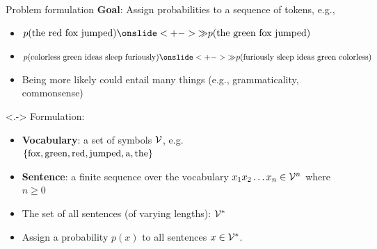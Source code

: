 \documentclass[usenames,dvipsnames,notes,11pt,aspectratio=169,hyperref={colorlinks=true, linkcolor=blue}]{beamer}
\newcommand{\pdfnote}[1]{}
\begin{document}
\begin{frame}
    {Problem formulation}
    \textbf{Goal}: Assign probabilities to a sequence of tokens, e.g., \\
    \begin{itemize}[<+->]
        \item $p(\text{the red fox jumped})
            \onslide<+->{\gg} p(\text{the green fox jumped})$
        \item $p(\text{colorless green ideas sleep furiously})
            \onslide<+->{\gg} p(\text{furiously sleep ideas green colorless})$
        \item Being more likely could entail many things (e.g., grammaticality, commonsense)
    \end{itemize}

    \onslide<.->{
        Formulation:\\}
    \begin{itemize}[<+->]
        \item \textbf{Vocabulary}: a set of symbols $\mathcal{V}$, e.g.\\
            \indent $\left\{ \text{fox}, \text{green}, \text{red}, \text{jumped}, \text{a}, \text{the} \right\}$
        \item \textbf{Sentence}: a {finite} sequence over the vocabulary $x_1 x_2 \ldots x_n \in \mathcal{V}^n$ where $n\ge 0$ %
        \item The set of all sentences (of varying lengths): $\mathcal{V}^*$ 
        \item Assign a probability $p(x)$ to all sentences $x\in\mathcal{V}^*$. 
    \end{itemize}
    \pdfnote{
        red > green: green fox is very rare.
        Grammatically correct sentences is more likely than gibberish.
    }
    \pdfnote{
        Language models tell us how likely we'll encounter a sentence in English. 
        A common misconception is that low probability under an LM means ungrammatical text. However, a sentence can be rare due to many reasons, it could contain rare words, being ungrammatical, or doesn't make any sense. Low probability doesn't necessarily mean ungrammaticality.
    }
    \pdfnote{
        Today, our task is to model this distribution and estimate its params given a corpus.
    }
\end{frame}
\end{document}
